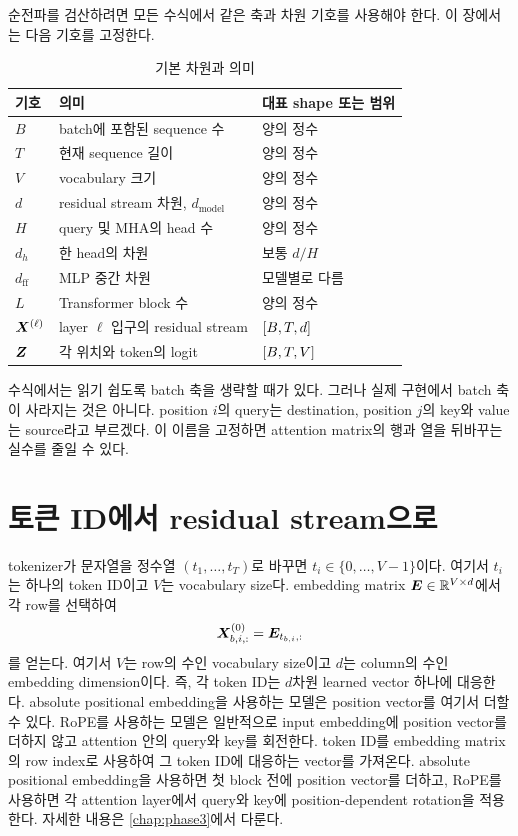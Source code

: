 순전파를 검산하려면 모든 수식에서 같은 축과 차원 기호를 사용해야 한다.
이 장에서는 다음 기호를 고정한다.

\begin{table}[htbp]
\centering
\caption{기본 차원과 의미}
\label{tab:forward-dimensions}
\begin{tabularx}{\textwidth}{@{}lYl@{}}
\toprule
기호 & 의미 & 대표 shape 또는 범위 \\
\midrule
$B$ & batch에 포함된 sequence 수 & 양의 정수 \\
$T$ & 현재 sequence 길이 & 양의 정수 \\
$V$ & vocabulary 크기 & 양의 정수 \\
$d$ & residual stream 차원, $d_{\text{model}}$ & 양의 정수 \\
$H$ & query 및 MHA의 head 수 & 양의 정수 \\
$d_h$ & 한 head의 차원 & 보통 $d/H$ \\
$d_{\mathrm{ff}}$ & MLP 중간 차원 & 모델별로 다름 \\
$L$ & Transformer block 수 & 양의 정수 \\
$\bm{X}^{(\ell)}$ & layer $\ell$ 입구의 residual stream & $\left[B,T,d\right]$ \\
$\bm{Z}$ & 각 위치와 token의 logit & $\left[B,T,V\right]$ \\
\bottomrule
\end{tabularx}
\end{table}

수식에서는 읽기 쉽도록 batch 축을 생략할 때가 있다.
그러나 실제 구현에서 batch 축이 사라지는 것은 아니다.
position $i$의 query는 destination, position $j$의 key와 value는 source라고 부르겠다.
이 이름을 고정하면 attention matrix의 행과 열을 뒤바꾸는 실수를 줄일 수 있다.

\section{토큰 ID에서 residual stream으로}

tokenizer가 문자열을 정수열 $(t_1,\ldots,t_T)$로 바꾸면 $t_i\in\{0,\ldots,V-1\}$이다.
여기서 $t_i$는 하나의 token ID이고 $V$는 vocabulary size다.
embedding matrix $\bm{E}\in\mathbb{R}^{V\times d}$에서 각 row를 선택하여
\begin{equation}
  \bm{X}^{(0)}_{b,i,:}=\bm{E}_{t_{b,i},:}
\end{equation}
를 얻는다.
여기서 $V$는 row의 수인 vocabulary size이고 $d$는 column의 수인 embedding dimension이다.
즉, 각 token ID는 $d$차원 learned vector 하나에 대응한다.
absolute positional embedding을 사용하는 모델은 position vector를 여기서 더할 수 있다.
RoPE를 사용하는 모델은 일반적으로 input embedding에 position vector를 더하지 않고 attention 안의 query와 key를 회전한다.
token ID를 embedding matrix의 row index로 사용하여 그 token ID에 대응하는 vector를 가져온다.
absolute positional embedding을 사용하면 첫 block 전에 position vector를 더하고, RoPE를 사용하면 각 attention layer에서 query와 key에 position-dependent rotation을 적용한다.
자세한 내용은 \cref{chap:phase3}에서 다룬다.

